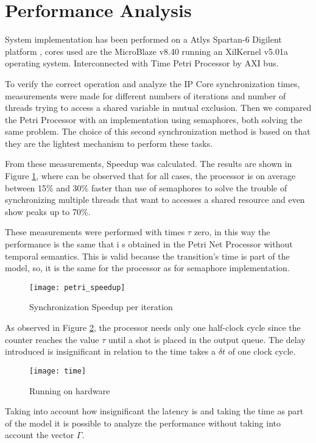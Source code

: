 \section{Performance Analysis}
	
	System implementation has been performed on a Atlys \texttrademark Spartan-6 Digilent platform \cite{atlys}, 
	cores used are the MicroBlaze v8.40 \cite{xilinx_microblaze} running an XilKernel v5.01a \cite{xilinx_xilkernel}
	operating system. Interconnected with Time Petri Processor by AXI bus\cite{xilinx_axi}.
	
	To verify the correct operation and analyze the IP Core synchronization times, measurements were 
	made for different numbers of iterations and number of threads trying to access a shared variable 
	in mutual exclusion. Then we compared the Petri Processor with an implementation using semaphores, 
	both solving the same problem. The choice of this second synchronization method is based on that 
	they are the lightest mechanism to perform these tasks.
	
	From these measurements, Speedup was calculated. The results are shown in Figure \ref{fig:speedup}, 
	where can be observed that for all cases, the processor is on average between 15\% and 30\% faster 
	than use of semaphores to solve the trouble of synchronizing multiple threads that want to accesses 
	a shared resource and even show peaks up to 70\%.
	
	These measurements were performed with times $\tau$ zero, in this way the performance is the same that i
	s obtained in the Petri Net Processor without temporal semantics. This is valid because the transition's
	time is part of the model, so, it is the same for the processor as for semaphore implementation.

		\begin{figure}[h]
			\centering
			\texttt{[image: petri\_speedup]}
			\caption{Synchronization Speedup per iteration}
			\label{fig:speedup}
		\end{figure}
		
	As observed in Figure \ref{fig:simulation}, the processor needs only one half-clock cycle since the 
	counter reaches the value $\tau$ until a shot is placed in the output queue. The delay introduced is 
	insignificant in relation to the time takes a $\delta t$ of one clock cycle.
	
		\begin{figure}[h]
			\centering
			\texttt{[image: time]}
			\caption{Running on hardware}
			\label{fig:simulation}
		\end{figure} 	
	
	Taking into account how insignificant the latency is and taking the time as part of the model it 
	is possible to analyze the performance without taking into account the vector $\Gamma$.	
	